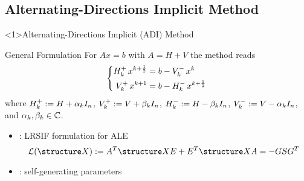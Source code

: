 \subsection{Alternating-Directions Implicit Method}

\begin{frame}<1>{Alternating-Directions Implicit (ADI) Method}
\begin{bigpicturecols}
  \begin{block}{General Formulation \parencite{Peaceman1955}}
    For $Ax=b$ with $A = H+V$ the method reads
    \begin{equation*}
    \left\{
    \begin{aligned}
      \mathop{H_k^+}  x^{k+\frac{1}{2}} &= b - \mathop{V_k^-} x^k \\
      \mathop{V_k^+} x^{k+1}           &= b - \mathop{H_k^-} x^{k+\frac{1}{2}}
    \end{aligned}
    \right.
    \end{equation*}
    where
    $\mathop{H_k^+}  := H + \alpha_k I_n$,
    $\mathop{V_k^+} := V + \beta_k  I_n$,
    $\mathop{H_k^-}  := H - \beta_k  I_n$,
    $\mathop{V_k^-} := V - \alpha_k I_n$,
    and $\alpha_k, \beta_k\in\mathbb{C}$.
  \end{block}
  \begin{itemize}
    \item
      \cite{Lang2017}: LRSIF formulation for ALE
      \begin{equation*}
        \Lyap(\structure X) := A^\T \structure X E + E^\T \structure X A = -GSG^\T
      \end{equation*}
    \item
      \cite{Kuerschner2016}: self-generating parameters
  \end{itemize}
\column{\bigpicturewidth}
\end{bigpicturecols}
\end{frame}
